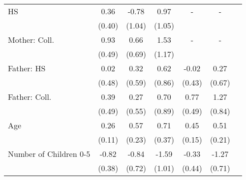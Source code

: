 \begin{tabular}{lcccccc}
HS&0.36&-0.78&0.97&-&-&\\&(0.40)&(1.04)&(1.05)&&&\\Mother: Coll.&0.93&0.66&1.53&-&-&\\&(0.49)&(0.69)&(1.17)&&&\\Father: HS&0.02&0.32&0.62&-0.02&0.27&\\&(0.48)&(0.59)&(0.86)&(0.43)&(0.67)&\\Father: Coll.&0.39&0.27&0.70&0.77&1.27&\\&(0.49)&(0.55)&(0.89)&(0.49)&(0.84)&\\Age&0.26&0.57&0.71&0.45&0.51&\\&(0.11)&(0.23)&(0.37)&(0.15)&(0.21)&\\Number of Children 0-5&-0.82&-0.84&-1.59&-0.33&-1.27&\\&(0.38)&(0.72)&(1.01)&(0.44)&(0.71)&\\\bottomrule\end{tabular}

